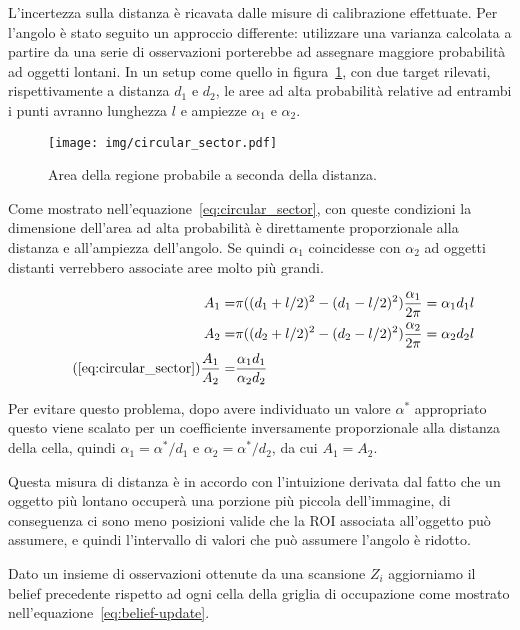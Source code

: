 \documentclass[10pt]{beamer}
\begin{document}
	L'incertezza sulla distanza è ricavata dalle misure di calibrazione
	effettuate. Per l'angolo è stato seguito un approccio differente:
	utilizzare una varianza calcolata a partire da una serie di osservazioni
	porterebbe ad assegnare maggiore probabilità ad oggetti lontani.  In un
	setup come quello in figura~\ref{fig:circular_sector}, con due target
	rilevati, rispettivamente a distanza $d_1$ e $d_2$, le aree ad alta
	probabilità relative ad entrambi i punti avranno lunghezza $l$ e ampiezze $
	\alpha_1 \text{ e } \alpha_2  $. 
	
	\begin{figure}[H]
		\centering
		\texttt{[image: img/circular\_sector.pdf]}
		\caption{Area della regione probabile a seconda della distanza.}
		\label{fig:circular_sector}
	\end{figure}

	Come mostrato nell'equazione~\ref{eq:circular_sector}, con queste
	condizioni la dimensione dell'area ad alta probabilità è direttamente
	proporzionale alla distanza e all'ampiezza dell'angolo. Se quindi $
	\alpha_1 $ coincidesse con $ \alpha _2 $ ad oggetti distanti verrebbero
	associate aree molto più grandi. 

	\begin{subequations}\label{eq:circular_sector}
	\begin{align*} 
		A_1  = & \pi((d_1+l/2)^2-(d_1-l/2)^2)\frac{\alpha_1}{2\pi}  =  \alpha_1 d_1l \\
		A_2  = & \pi((d_2+l/2)^2-(d_2-l/2)^2)\frac{\alpha_2}{2\pi}  =  \alpha_2 d_2l \\
\tag{\ref{eq:circular_sector}}
		\frac{A_1}{A_2} = & \frac	{\alpha_1 d_1} {\alpha_2 d_2}
	\end{align*}
	\end{subequations}
	
		
	Per evitare questo problema, dopo avere
	individuato un valore $ \alpha ^* $ appropriato questo viene scalato per un
	coefficiente inversamente proporzionale alla distanza della cella, quindi $
	\alpha _1 = \alpha ^*/d_1 $ e $ \alpha _2=\alpha ^*/d_2 $, da cui $A_1=A_2$. 
	
	Questa misura di distanza è in accordo con l'intuizione derivata dal fatto
	che un oggetto più lontano occuperà una porzione più piccola dell'immagine,
	di conseguenza ci sono meno posizioni valide che la ROI associata
	all'oggetto può assumere, e quindi l'intervallo di valori che può assumere
	l'angolo è ridotto.

	
	Dato un insieme di osservazioni ottenute da una scansione $ Z_i $ aggiorniamo il belief precedente rispetto ad ogni cella della griglia di occupazione come mostrato nell'equazione~\ref{eq:belief-update}.
\end{document}

